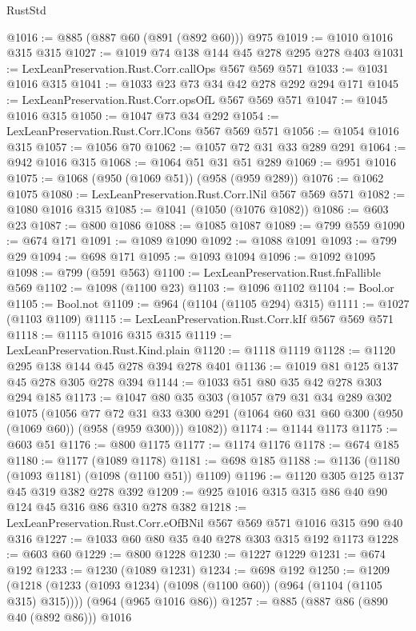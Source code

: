 \begin{lexlean}{RustStd}
\begin{coremodule}
@1016 := @885 (@887 @60 (@891 (@892 @60))) @975
@1019 := @1010 @1016 @315 @315
@1027 := @1019 @74 @138 @144 @45 @278 @295 @278 @403
@1031 := LexLeanPreservation.Rust.Corr.callOps @567 @569 @571
@1033 := @1031 @1016 @315
@1041 := @1033 @23 @73 @34 @42 @278 @292 @294 @171
@1045 := LexLeanPreservation.Rust.Corr.opsOfL @567 @569 @571
@1047 := @1045 @1016 @315
@1050 := @1047 @73 @34 @292
@1054 := LexLeanPreservation.Rust.Corr.lCons @567 @569 @571
@1056 := @1054 @1016 @315
@1057 := @1056 @70
@1062 := @1057 @72 @31 @33 @289 @291
@1064 := @942 @1016 @315
@1068 := @1064 @51 @31 @51 @289
@1069 := @951 @1016
@1075 := @1068 (@950 (@1069 @51)) (@958 (@959 @289))
@1076 := @1062 @1075
@1080 := LexLeanPreservation.Rust.Corr.lNil @567 @569 @571
@1082 := @1080 @1016 @315
@1085 := @1041 (@1050 (@1076 @1082))
@1086 := @603 @23
@1087 := @800 @1086
@1088 := @1085 @1087
@1089 := @799 @559
@1090 := @674 @171
@1091 := @1089 @1090
@1092 := @1088 @1091
@1093 := @799 @29
@1094 := @698 @171
@1095 := @1093 @1094
@1096 := @1092 @1095
@1098 := @799 (@591 @563)
@1100 := LexLeanPreservation.Rust.fnFallible @569
@1102 := @1098 (@1100 @23)
@1103 := @1096 @1102
@1104 := Bool.or
@1105 := Bool.not
@1109 := @964 (@1104 (@1105 @294) @315)
@1111 := @1027 (@1103 @1109)
@1115 := LexLeanPreservation.Rust.Corr.kIf @567 @569 @571
@1118 := @1115 @1016 @315 @315
@1119 := LexLeanPreservation.Rust.Kind.plain
@1120 := @1118 @1119
@1128 := @1120 @295 @138 @144 @45 @278 @394 @278 @401
@1136 := @1019 @81 @125 @137 @45 @278 @305 @278 @394
@1144 := @1033 @51 @80 @35 @42 @278 @303 @294 @185
@1173 := @1047
    @80
    @35
    @303
    (@1057
      @79
      @31
      @34
      @289
      @302
      @1075
      (@1056
        @77
        @72
        @31
        @33
        @300
        @291
        (@1064 @60 @31 @60 @300 (@950 (@1069 @60)) (@958 (@959 @300)))
        @1082))
@1174 := @1144 @1173
@1175 := @603 @51
@1176 := @800 @1175
@1177 := @1174 @1176
@1178 := @674 @185
@1180 := @1177 (@1089 @1178)
@1181 := @698 @185
@1188 := @1136 (@1180 (@1093 @1181) (@1098 (@1100 @51)) @1109)
@1196 := @1120 @305 @125 @137 @45 @319 @382 @278 @392
@1209 := @925 @1016 @315 @315 @86 @40 @90 @124 @45 @316 @86 @310 @278 @382
@1218 := LexLeanPreservation.Rust.Corr.eOfBNil @567 @569 @571 @1016 @315 @90 @40 @316
@1227 := @1033 @60 @80 @35 @40 @278 @303 @315 @192 @1173
@1228 := @603 @60
@1229 := @800 @1228
@1230 := @1227 @1229
@1231 := @674 @192
@1233 := @1230 (@1089 @1231)
@1234 := @698 @192
@1250 := @1209
    (@1218 (@1233 (@1093 @1234) (@1098 (@1100 @60)) (@964 (@1104 (@1105 @315) @315))))
    (@964 (@965 @1016 @86))
@1257 := @885 (@887 @86 (@890 @40 (@892 @86))) @1016

\end{coremodule}
\end{lexlean}
